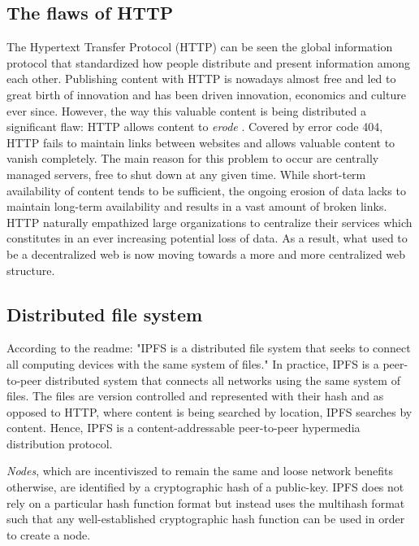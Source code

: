 \documentclass[conference]{IEEEtran}
\begin{document}
\subsection{The flaws of HTTP}
The Hypertext Transfer Protocol (HTTP) can be seen the global information protocol that standardized how people distribute and present information among each other.
Publishing content with HTTP is nowadays almost free and led to great birth of innovation and has been driven innovation, economics and culture ever since.
However, the way this valuable content is being distributed a significant flaw: HTTP allows content to \textit{erode} \cite{http-obsolete}.
Covered by error code 404\cite{http-rfc}, HTTP fails to maintain links between websites and allows valuable content to vanish completely.
The main reason for this problem to occur are centrally managed servers, free to shut down at any given time.
While short-term availability of content tends to be sufficient, the ongoing erosion of data lacks to maintain long-term availability and results in a vast amount of broken links\cite{broken-links}.
HTTP naturally empathized large organizations to centralize their services which constitutes in an ever increasing potential loss of data.
As a result, what used to be a decentralized web is now moving towards a more and more centralized web structure.

\subsection{Distributed file system}
\label{subsec:ipfs-dfs}
According to the readme\cite{ipfs-github}: "IPFS is a distributed file system that seeks to connect all computing devices with the same system of files."
In practice, IPFS is a peer-to-peer distributed system that connects all networks using the same system of files. 
The files are version controlled and represented with their hash and as opposed to HTTP, where content is being searched by location, IPFS searches by content.
Hence, IPFS is a content-addressable peer-to-peer hypermedia distribution protocol.

\textit{Nodes}, which are incentiviszed to remain the same and loose network benefits otherwise, are identified by a cryptographic hash of a public-key.
IPFS does not rely on a particular hash function format but instead uses the multihash\cite{multihash} format such that any well-established cryptographic hash function can be used in order to create a node.
\end{document}
